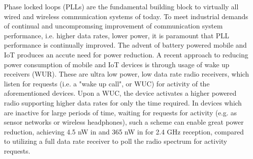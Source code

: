 Phase locked loops (PLLs) are the fundamental building block to virtually all wired and wireless communication systems of today. To meet industrial demands of continual and uncompromsing improvement of communication system performance, i.e. higher data rates, lower power, it is paramount that PLL performance is continually improved. The advent of battery powered mobile and IoT produces an accute need for power reduction. A recent approach to reducing power consumption of mobile and IoT devices is through usage of wake up receivers (WUR). These are ultra low power, low data rate radio receivers, which listen for requests (i.e. a "wake up call", or WUC) for activity of the aforementioned devices. Upon a WUC, the device activates a higher powered radio supporting higher data rates for only the time required. In devices which are inactive for large periods of time, waiting for requests for activity (e.g. as sensor networks or wireless headphones), such a scheme can enable great power reduction, achieving 4.5 nW in \cite{Jiang2017} and 365 nW in \cite{Sadagopan2017} for 2.4 GHz reception, compared to utilizing a full data rate receiver to poll the radio spectrum for activity requests. 

